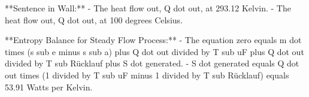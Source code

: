 **Sentence in Wall:**
- The heat flow out, Q dot out, at 293.12 Kelvin.
- The heat flow out, Q dot out, at 100 degrees Celsius.

**Entropy Balance for Steady Flow Process:**
- The equation zero equals m dot times (s sub e minus s sub a) plus Q dot out divided by T sub uF plus Q dot out divided by T sub Rücklauf plus S dot generated.
- S dot generated equals Q dot out times (1 divided by T sub uF minus 1 divided by T sub Rücklauf) equals 53.91 Watts per Kelvin.